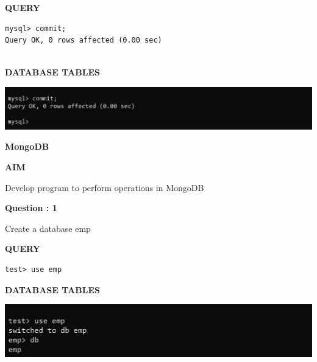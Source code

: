 \documentclass[a4paper,12pt]{report}
\begin{document}
\begin{flushleft}
\textbf{QUERY }
\end{flushleft}
 \begin{verbatim}
mysql> commit;
Query OK, 0 rows affected (0.00 sec)


\end{verbatim}
\begin{flushleft}
\textbf{DATABASE TABLES}
\end{flushleft}

\includegraphics[scale=0.4]{tcl4.png}

\newpage
\begin{center}
\large\textbf{MongoDB}
\end{center}

\begin{flushleft}
\textbf{AIM }
\end{flushleft}
Develop program to perform operations in MongoDB

\begin{flushleft}
    \textbf{Question : 1}
\end{flushleft}
Create a database emp

\begin{flushleft}
\textbf{QUERY }
\end{flushleft}
 \begin{verbatim}
test> use emp
\end{verbatim}
\begin{flushleft}
\textbf{DATABASE TABLES}
\end{flushleft}
\includegraphics[scale=0.464]{M1c.png}
\end{document}
